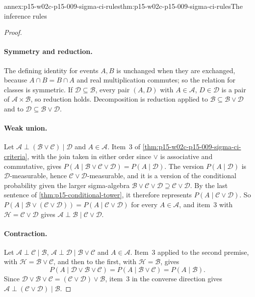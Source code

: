 \begin{annexitem}{annex:p15-w02c-p15-009-sigma-ci-rules}{thm:p15-w02c-p15-009-sigma-ci-rules}{The inference rules}
\begin{proof}
\paragraph{Symmetry and reduction.} The defining identity for events
\(A,B\) is unchanged when they are exchanged, because
\(A\cap B=B\cap A\) and real multiplication commutes; so the relation for
classes is symmetric. If \(\mathcal D\subseteq\mathcal B\), every pair
\((A,D)\) with \(A\in\mathcal A\), \(D\in\mathcal D\) is a pair of
\(\mathcal A\times\mathcal B\), so reduction holds. Decomposition is
reduction applied to \(\mathcal B\subseteq\mathcal B\vee\mathcal D\) and to
\(\mathcal D\subseteq\mathcal B\vee\mathcal D\).

\paragraph{Weak union.} Let \(\mathcal A\perp(\mathcal B\vee\mathcal C)\mid\mathcal D\)
and \(A\in\mathcal A\). Item~3 of
\cref{thm:p15-w02c-p15-009-sigma-ci-criteria}, with the join taken in
either order since \(\vee\) is associative and commutative, gives
\(P(A\mid\mathcal B\vee\mathcal C\vee\mathcal D)=P(A\mid\mathcal D)\).
The version \(P(A\mid\mathcal D)\) is \(\mathcal D\)-measurable, hence
\(\mathcal C\vee\mathcal D\)-measurable, and it is a version of the
conditional probability given the larger sigma-algebra
\(\mathcal B\vee\mathcal C\vee\mathcal D\supseteq\mathcal C\vee\mathcal D\).
By the last sentence of \cref{thm:p15-conditional-tower}, it therefore
represents \(P(A\mid\mathcal C\vee\mathcal D)\). So
\(P(A\mid\mathcal B\vee(\mathcal C\vee\mathcal D))=P(A\mid\mathcal C\vee\mathcal D)\)
for every \(A\in\mathcal A\), and item~3 with
\(\mathcal H=\mathcal C\vee\mathcal D\) gives
\(\mathcal A\perp\mathcal B\mid\mathcal C\vee\mathcal D\).

\paragraph{Contraction.} Let \(\mathcal A\perp\mathcal C\mid\mathcal B\),
\(\mathcal A\perp\mathcal D\mid\mathcal B\vee\mathcal C\) and
\(A\in\mathcal A\). Item~3 applied to the second premise, with
\(\mathcal H=\mathcal B\vee\mathcal C\), and then to the first, with
\(\mathcal H=\mathcal B\), gives
\[
 P(A\mid\mathcal D\vee\mathcal B\vee\mathcal C)=P(A\mid\mathcal B\vee\mathcal C)
 =P(A\mid\mathcal B).
\]
Since \(\mathcal D\vee\mathcal B\vee\mathcal C=(\mathcal C\vee\mathcal D)\vee\mathcal B\),
item~3 in the converse direction gives
\(\mathcal A\perp(\mathcal C\vee\mathcal D)\mid\mathcal B\).


\end{proof}
\end{annexitem}
